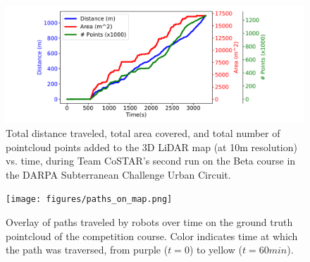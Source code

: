 \documentclass{article}
\newcommand{\ph}[1]{{\textbf{#1}:}} %
\begin{document}
\begin{figure}[ht!]
  \includegraphics[width=.48\textwidth,trim=3cm 0 4cm 0, clip]{figures/dist_traveled.pdf}
  \centering
  \caption{Total distance traveled, total area covered, and total number of pointcloud points added to the 3D LiDAR map (at 10m resolution) vs.  time, during Team CoSTAR's second run on the Beta course in the DARPA Subterranean Challenge Urban Circuit.}
  \label{fig:dist_traveled}
\end{figure}

\begin{figure}[ht!]
  \texttt{[image: figures/paths\_on\_map.png]}
  \centering
  \caption{Overlay of paths traveled by robots over time on the ground truth pointcloud of the competition course.  Color indicates time at which the path was traversed, from purple ($t=0$) to yellow ($t=60min$).}
  \label{fig:paths_on_map}
\end{figure}








\end{document}
